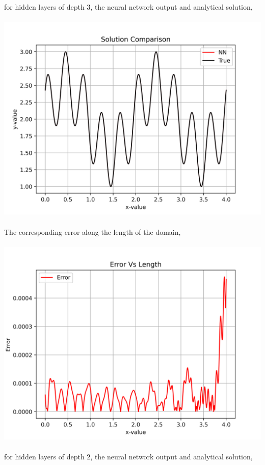 \documentclass[a4paper, 12pt]{report}
\def\size{0.92}
\begin{document}
\begin{center}
\\~\\for hidden layers of depth $3$, the neural network output and analytical solution,
\\~\\\includegraphics[scale=\size]{depthsol3.png}
\\~\\The corresponding error along the length of the domain,
\\~\\\includegraphics[scale=\size]{deptherr3.png}
\\~\\for hidden layers of depth $2$, the neural network output and analytical solution,

\end{center}
\end{document}
